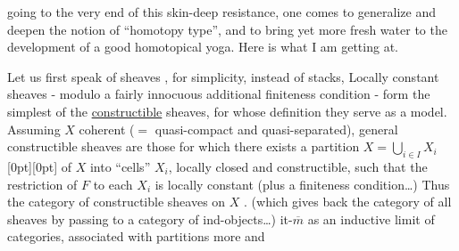 %
going to the very end\unsure{,} of this skin-deep resistance, one comes to generalize and deepen the notion of ``homotopy type'', and to bring yet more fresh water to the development of a good homotopical yoga. Here is what I am getting at.

Let us first speak of sheaves , for simplicity, instead of stacks,  Locally constant sheaves - modulo a fairly innocuous additional finiteness condition - form the simplest of the \uline{constructible} sheaves, for whose definition they serve as a model. Assuming $X$ coherent ($=$ quasi-compact and quasi-separated), general constructible sheaves are those for which there exists a  partition $X=\bigcup\limits_{i\in I}X_i$\raisebox{-1.7ex}[0pt][0pt]{} of $X$ into ``cells''  $X_i$, locally closed and constructible, such that  the restriction of $F$ to each $X_i$ is locally constant  (plus a finiteness condition\ldots) Thus the category of constructible sheaves on $X$ . (which gives back the category of all sheaves by passing to a category of ind-objects\ldots) it-$\overline m$  as an inductive limit of categories, associated with partitions more and
